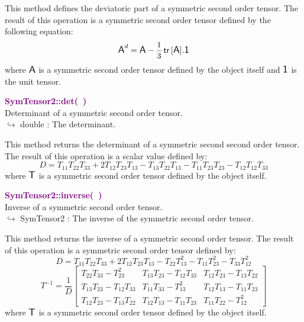 This method defines the deviatoric part of a symmetric second order tensor.
The result of this operation is a symmetric second order tensor defined by the following equation:
\begin{equation*}
\mbox{\large\ensuremath{\mathsf{A}}}^d=\mbox{\large\ensuremath{\mathsf{A}}}-\frac{1}{3}\mbox{\ensuremath{\mathsf{\,tr\,}}}[\mbox{\large\ensuremath{\mathsf{A}}}].\mbox{\large\ensuremath{\mathsf{1}}}
\end{equation*}
where $\mbox{\large\ensuremath{\mathsf{A}}}$ is a symmetric second order tensor defined by the object itself and $\mbox{\large\ensuremath{\mathsf{1}}}$ is the unit tensor.

\textcolor{purple}{\textbf{SymTensor2::det(~)}}\label{SymTensor2::det()}\\
Determinant of a symmetric second order tensor.\\ \hspace*{10mm}$\hookrightarrow$ double : The determinant.

This method returns the determinant of a symmetric second second order tensor.
The result of this operation is a scalar value defined by:
\begin{equation*}
D = T_{11} T_{22} T_{33} + 2 T_{12} T_{23} T_{13} - T_{13} T_{22} T_{13} - T_{11} T_{23} T_{23} - T_{12} T_{12} T_{33}
\end{equation*}
where $\mbox{\large\ensuremath{\mathsf{T}}}$ is a symmetric second order tensor defined by the object itself.

\textcolor{purple}{\textbf{SymTensor2::inverse(~)}}\label{SymTensor2::inverse()}\\
Inverse of a symmetric second order tensor.\\ \hspace*{10mm}$\hookrightarrow$ SymTensor2 : The inverse of the symmetric second order tensor.

This method returns the inverse of a symmetric second order tensor.
The result of this operation is a symmetric second order tensor defined by:
\begin{equation*}
D = T_{11} T_{22} T_{33} + 2 T_{12} T_{23} T_{13} - T_{22} T_{13}^2 - T_{11} T_{23}^2 - T_{33} T_{12}^2
\end{equation*}
\begin{equation*}
T^{-1} = \frac {1}{D} \left[\begin{array}{ccc}
  T_{22}T_{33}-T_{23}^2&T_{13}T_{23}-T_{12}T_{33}&T_{12}T_{23}-T_{13}T_{22}\\
  T_{13}T_{23}-T_{12}T_{33}&T_{11}T_{33}-T_{13}^2&T_{12}T_{13}-T_{11}T_{23}\\
  T_{12}T_{23}-T_{13}T_{22}&T_{12}T_{13}-T_{11}T_{23}&T_{11}T_{22}-T_{12}^2
  \end{array}
  \right]
\end{equation*}
where $\mbox{\large\ensuremath{\mathsf{T}}}$ is a symmetric second order tensor defined by the object itself.

